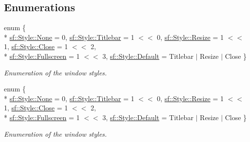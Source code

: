 \subsection*{Enumerations}
\begin{DoxyCompactItemize}
\item 
enum \{ \\*
\hyperlink{group__window_gga363853f6419f9ca64dcd85eae2e5caa9ac2b155f5f7b49b49c7fb99655f8da86e}{sf\-::\-Style\-::\-None} = 0, 
\hyperlink{group__window_gga363853f6419f9ca64dcd85eae2e5caa9abf046c6fcae63075c651812c6774e389}{sf\-::\-Style\-::\-Titlebar} = 1 $<$$<$ 0, 
\hyperlink{group__window_gga363853f6419f9ca64dcd85eae2e5caa9aa7c6f765bd5c0cdd9f81b47871508f3e}{sf\-::\-Style\-::\-Resize} = 1 $<$$<$ 1, 
\hyperlink{group__window_gga363853f6419f9ca64dcd85eae2e5caa9a76bbd82b28e359cc0feec9e5ec123b40}{sf\-::\-Style\-::\-Close} = 1 $<$$<$ 2, 
\\*
\hyperlink{group__window_gga363853f6419f9ca64dcd85eae2e5caa9ac0b0bcb071d1ae40aefb7a1a7464f079}{sf\-::\-Style\-::\-Fullscreen} = 1 $<$$<$ 3, 
\hyperlink{group__window_gga363853f6419f9ca64dcd85eae2e5caa9aaf73ca9c9fa787f9da9c1d7527d42734}{sf\-::\-Style\-::\-Default} = Titlebar $\vert$ Resize $\vert$ Close
 \}
\begin{DoxyCompactList}\small\item\em Enumeration of the window styles. \end{DoxyCompactList}\item 
enum \{ \\*
\hyperlink{group__window_gga363853f6419f9ca64dcd85eae2e5caa9ac2b155f5f7b49b49c7fb99655f8da86e}{sf\-::\-Style\-::\-None} = 0, 
\hyperlink{group__window_gga363853f6419f9ca64dcd85eae2e5caa9abf046c6fcae63075c651812c6774e389}{sf\-::\-Style\-::\-Titlebar} = 1 $<$$<$ 0, 
\hyperlink{group__window_gga363853f6419f9ca64dcd85eae2e5caa9aa7c6f765bd5c0cdd9f81b47871508f3e}{sf\-::\-Style\-::\-Resize} = 1 $<$$<$ 1, 
\hyperlink{group__window_gga363853f6419f9ca64dcd85eae2e5caa9a76bbd82b28e359cc0feec9e5ec123b40}{sf\-::\-Style\-::\-Close} = 1 $<$$<$ 2, 
\\*
\hyperlink{group__window_gga363853f6419f9ca64dcd85eae2e5caa9ac0b0bcb071d1ae40aefb7a1a7464f079}{sf\-::\-Style\-::\-Fullscreen} = 1 $<$$<$ 3, 
\hyperlink{group__window_gga363853f6419f9ca64dcd85eae2e5caa9aaf73ca9c9fa787f9da9c1d7527d42734}{sf\-::\-Style\-::\-Default} = Titlebar $\vert$ Resize $\vert$ Close
 \}
\begin{DoxyCompactList}\small\item\em Enumeration of the window styles. \end{DoxyCompactList}\end{DoxyCompactItemize}


